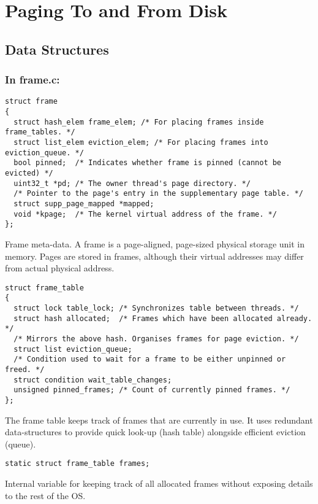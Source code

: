 \section{Paging To and From Disk}

\subsection{Data Structures}

\subsubsection*{In frame.c:}

\begin{verbatim}
struct frame
{
  struct hash_elem frame_elem; /* For placing frames inside frame_tables. */
  struct list_elem eviction_elem; /* For placing frames into eviction_queue. */
  bool pinned;  /* Indicates whether frame is pinned (cannot be evicted) */
  uint32_t *pd; /* The owner thread's page directory. */
  /* Pointer to the page's entry in the supplementary page table. */
  struct supp_page_mapped *mapped;
  void *kpage;  /* The kernel virtual address of the frame. */
};
\end{verbatim}
Frame meta-data.
A frame is a page-aligned, page-sized physical storage unit in memory.
Pages are stored in frames, although their virtual addresses may differ from actual physical address.

\begin{verbatim}
struct frame_table
{
  struct lock table_lock; /* Synchronizes table between threads. */
  struct hash allocated;  /* Frames which have been allocated already. */
  /* Mirrors the above hash. Organises frames for page eviction. */
  struct list eviction_queue;
  /* Condition used to wait for a frame to be either unpinned or freed. */
  struct condition wait_table_changes;
  unsigned pinned_frames; /* Count of currently pinned frames. */
};
\end{verbatim}
The frame table keeps track of frames that are currently in use.
It uses redundant data-structures to provide quick look-up (hash table) alongside efficient eviction (queue).


\begin{verbatim}
static struct frame_table frames;
\end{verbatim}
Internal variable for keeping track of all allocated frames without exposing details to the rest of the OS.

